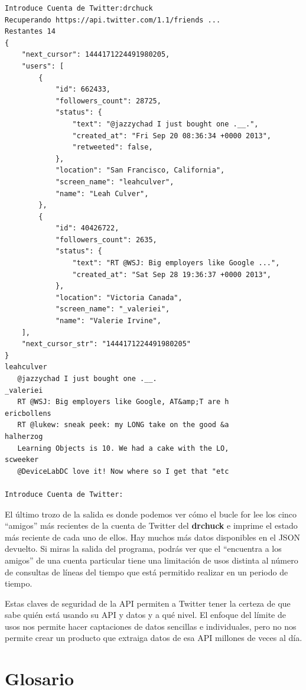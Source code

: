 \beforeverb
\begin{verbatim}
Introduce Cuenta de Twitter:drchuck
Recuperando https://api.twitter.com/1.1/friends ...
Restantes 14
{
    "next_cursor": 1444171224491980205, 
    "users": [
        {
            "id": 662433, 
            "followers_count": 28725, 
            "status": {
                "text": "@jazzychad I just bought one .__.", 
                "created_at": "Fri Sep 20 08:36:34 +0000 2013", 
                "retweeted": false, 
            }, 
            "location": "San Francisco, California", 
            "screen_name": "leahculver", 
            "name": "Leah Culver", 
        }, 
        {
            "id": 40426722, 
            "followers_count": 2635, 
            "status": {
                "text": "RT @WSJ: Big employers like Google ...", 
                "created_at": "Sat Sep 28 19:36:37 +0000 2013", 
            }, 
            "location": "Victoria Canada", 
            "screen_name": "_valeriei", 
            "name": "Valerie Irvine", 
    ], 
    "next_cursor_str": "1444171224491980205"
}
leahculver
   @jazzychad I just bought one .__.
_valeriei
   RT @WSJ: Big employers like Google, AT&amp;T are h
ericbollens
   RT @lukew: sneak peek: my LONG take on the good &a
halherzog
   Learning Objects is 10. We had a cake with the LO,
scweeker
   @DeviceLabDC love it! Now where so I get that "etc

Introduce Cuenta de Twitter:
\end{verbatim}
\afterverb
%
El último trozo de la salida es donde podemos ver cómo el bucle for lee los
cinco ``amigos'' más recientes de la cuenta de Twitter del {\bf drchuck}
e imprime el estado más reciente de cada uno de ellos. Hay
muchos más datos disponibles en el JSON devuelto. Si miras
la salida del programa, podrás ver que el ``encuentra a los amigos''
de una cuenta particular tiene una limitación de usos distinta al
número de consultas de líneas del tiempo que está permitido realizar en un periodo de tiempo.

Estas claves de seguridad de la API permiten a Twitter tener la certeza de que
sabe quién está usando su API y datos y a qué nivel. El enfoque del
límite de usos nos permite hacer captaciones de datos sencillas e individuales, pero
no nos permite crear un producto que extraiga datos de esa API
millones de veces al día.

\section{Glosario}

